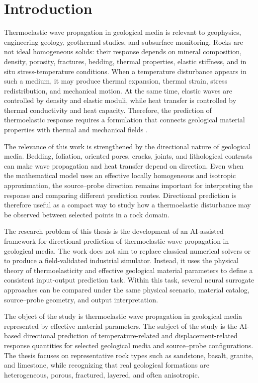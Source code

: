 \section[\texorpdfstring{\protect\numberline{}INTRODUCTION}{INTRODUCTION}]{Introduction}

Thermoelastic wave propagation in geological media is relevant to geophysics, engineering geology, geothermal studies, and subsurface monitoring. Rocks are not ideal homogeneous solids: their response depends on mineral composition, density, porosity, fractures, bedding, thermal properties, elastic stiffness, and in situ stress-temperature conditions. When a temperature disturbance appears in such a medium, it may produce thermal expansion, thermal strain, stress redistribution, and mechanical motion. At the same time, elastic waves are controlled by density and elastic moduli, while heat transfer is controlled by thermal conductivity and heat capacity. Therefore, the prediction of thermoelastic response requires a formulation that connects geological material properties with thermal and mechanical fields \cite{mavko2009,jaeger2007,aki2002,nowacki1986}.

The relevance of this work is strengthened by the directional nature of geological media. Bedding, foliation, oriented pores, cracks, joints, and lithological contrasts can make wave propagation and heat transfer depend on direction. Even when the mathematical model uses an effective locally homogeneous and isotropic approximation, the source--probe direction remains important for interpreting the response and comparing different prediction routes. Directional prediction is therefore useful as a compact way to study how a thermoelastic disturbance may be observed between selected points in a rock domain.

The research problem of this thesis is the development of an AI-assisted framework for directional prediction of thermoelastic wave propagation in geological media. The work does not aim to replace classical numerical solvers or to produce a field-validated industrial simulator. Instead, it uses the physical theory of thermoelasticity and effective geological material parameters to define a consistent input-output prediction task. Within this task, several neural surrogate approaches can be compared under the same physical scenario, material catalog, source--probe geometry, and output interpretation.

The object of the study is thermoelastic wave propagation in geological media represented by effective material parameters. The subject of the study is the AI-based directional prediction of temperature-related and displacement-related response quantities for selected geological media and source--probe configurations. The thesis focuses on representative rock types such as sandstone, basalt, granite, and limestone, while recognizing that real geological formations are heterogeneous, porous, fractured, layered, and often anisotropic.

